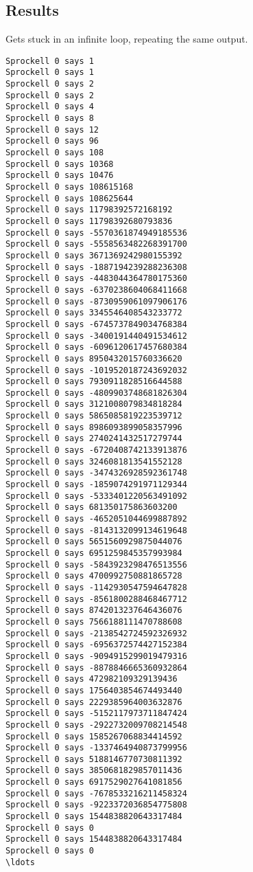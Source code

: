 \documentclass[twoside]{report}
\begin{document}
\subsection{Results}
Gets stuck in an infinite loop, repeating the same output.
\begin{verbatim}
Sprockell 0 says 1
Sprockell 0 says 1
Sprockell 0 says 2
Sprockell 0 says 2
Sprockell 0 says 4
Sprockell 0 says 8
Sprockell 0 says 12
Sprockell 0 says 96
Sprockell 0 says 108
Sprockell 0 says 10368
Sprockell 0 says 10476
Sprockell 0 says 108615168
Sprockell 0 says 108625644
Sprockell 0 says 11798392572168192
Sprockell 0 says 11798392680793836
Sprockell 0 says -5570361874949185536
Sprockell 0 says -5558563482268391700
Sprockell 0 says 3671369242980155392
Sprockell 0 says -1887194239288236308
Sprockell 0 says -4483044364780175360
Sprockell 0 says -6370238604068411668
Sprockell 0 says -8730959061097906176
Sprockell 0 says 3345546408543233772
Sprockell 0 says -6745737849034768384
Sprockell 0 says -3400191440491534612
Sprockell 0 says -6096120617457680384
Sprockell 0 says 8950432015760336620
Sprockell 0 says -1019520187243692032
Sprockell 0 says 7930911828516644588
Sprockell 0 says -4809903748681826304
Sprockell 0 says 3121008079834818284
Sprockell 0 says 5865085819223539712
Sprockell 0 says 8986093899058357996
Sprockell 0 says 2740241432517279744
Sprockell 0 says -6720408742133913876
Sprockell 0 says 3246081813541552128
Sprockell 0 says -3474326928592361748
Sprockell 0 says -1859074291971129344
Sprockell 0 says -5333401220563491092
Sprockell 0 says 681350175863603200
Sprockell 0 says -4652051044699887892
Sprockell 0 says -8143132099134619648
Sprockell 0 says 5651560929875044076
Sprockell 0 says 6951259845357993984
Sprockell 0 says -5843923298476513556
Sprockell 0 says 4700992750881865728
Sprockell 0 says -1142930547594647828
Sprockell 0 says -8561800288468467712
Sprockell 0 says 8742013237646436076
Sprockell 0 says 7566188111470788608
Sprockell 0 says -2138542724592326932
Sprockell 0 says -6956372574427152384
Sprockell 0 says -9094915299019479316
Sprockell 0 says -8878846665360932864
Sprockell 0 says 472982109329139436
Sprockell 0 says 1756403854674493440
Sprockell 0 says 2229385964003632876
Sprockell 0 says -5152117973711847424
Sprockell 0 says -2922732009708214548
Sprockell 0 says 1585267068834414592
Sprockell 0 says -1337464940873799956
Sprockell 0 says 5188146770730811392
Sprockell 0 says 3850681829857011436
Sprockell 0 says 6917529027641081856
Sprockell 0 says -7678533216211458324
Sprockell 0 says -9223372036854775808
Sprockell 0 says 1544838820643317484
Sprockell 0 says 0
Sprockell 0 says 1544838820643317484
Sprockell 0 says 0
\ldots
\end{verbatim}
\end{document}
